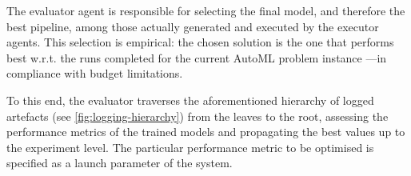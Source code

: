 \documentclass[runningheads]{llncs}
\begin{document}
The evaluator agent is responsible for selecting the final model,
and therefore the best pipeline,
among those actually generated and executed by the executor agents.
%
This selection is empirical:
the chosen solution is the one that performs best
w.r.t. the runs completed for the current \ac{AutoML} problem instance%
---in compliance with budget limitations.

To this end,
the evaluator traverses the aforementioned hierarchy of logged artefacts
(see \cref{fig:logging-hierarchy})
from the leaves to the root,
assessing the performance metrics of the trained models and propagating the best values up to the experiment level.
%
The particular performance metric to be optimised is specified as a launch parameter of the system.



\end{document}
